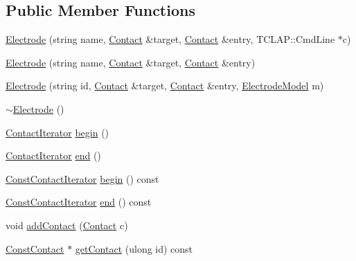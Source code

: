 \subsection*{Public Member Functions}
\begin{DoxyCompactItemize}
\item 
\hyperlink{classElectrode_a771e572c858046f109f73ee04d78e509}{Electrode} (string name, \hyperlink{classElectrode_ac64c4a90469345a5d3e260da59765a76}{Contact} \&target, \hyperlink{classElectrode_ac64c4a90469345a5d3e260da59765a76}{Contact} \&entry, T\-C\-L\-A\-P\-::\-Cmd\-Line $\ast$c)
\item 
\hyperlink{classElectrode_a3914606286820a309e87b47a79792fc8}{Electrode} (string name, \hyperlink{classElectrode_ac64c4a90469345a5d3e260da59765a76}{Contact} \&target, \hyperlink{classElectrode_ac64c4a90469345a5d3e260da59765a76}{Contact} \&entry)
\item 
\hyperlink{classElectrode_ad16409e5fbe3dbdc0d4bcfd6a148ad40}{Electrode} (string id, \hyperlink{classElectrode_ac64c4a90469345a5d3e260da59765a76}{Contact} \&target, \hyperlink{classElectrode_ac64c4a90469345a5d3e260da59765a76}{Contact} \&entry, \hyperlink{classElectrodeModel}{Electrode\-Model} m)
\item 
\hyperlink{classElectrode_aaea00b81726c5cad6a390659870ead58}{$\sim$\-Electrode} ()
\item 
\hyperlink{classElectrode_a682d94c6e93fc27e2135d3a894fe9722}{Contact\-Iterator} \hyperlink{classElectrode_a105771c0b9c630f3da68c9f220d62470}{begin} ()
\item 
\hyperlink{classElectrode_a682d94c6e93fc27e2135d3a894fe9722}{Contact\-Iterator} \hyperlink{classElectrode_ae02470004771e62d2cb9227ad2ebb6b7}{end} ()
\item 
\hyperlink{classElectrode_a8c56b50a83beed1bf104d079083386b5}{Const\-Contact\-Iterator} \hyperlink{classElectrode_af424b68151e09051b9e50cb1e087ad1d}{begin} () const 
\item 
\hyperlink{classElectrode_a8c56b50a83beed1bf104d079083386b5}{Const\-Contact\-Iterator} \hyperlink{classElectrode_a9fa4b4f90a58bc2ef4ef00bc2e8a7cbe}{end} () const 
\item 
void \hyperlink{classElectrode_a0422c73e1a10045d2efb36a96f8b48f3}{add\-Contact} (\hyperlink{classElectrode_ac64c4a90469345a5d3e260da59765a76}{Contact} c)
\item 
\hyperlink{classElectrode_a6dc621793b4ffa70e6bc3f2627ec8bf6}{Const\-Contact} $\ast$ \hyperlink{classElectrode_a3bb7efc38bbb2322722320fa5dfb14b7}{get\-Contact} (ulong id) const 

\end{DoxyCompactItemize}
